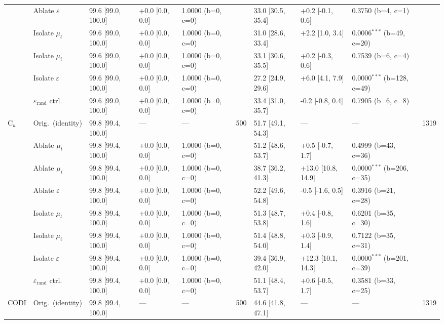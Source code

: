 \begin{table}[h!]
\begin{tabular}{ll lllc lllc}
 & Ablate $\varepsilon$ & 99.6 [99.0, 100.0] & +0.0 [0.0, 0.0] & 1.0000 (b=0, c=0) &  & 33.0 [30.5, 35.4] & +0.2 [-0.1, 0.6] & 0.3750 (b=4, c=1) &  \\
 & Isolate $\mu_t$ & 99.6 [99.0, 100.0] & +0.0 [0.0, 0.0] & 1.0000 (b=0, c=0) &  & 31.0 [28.6, 33.4] & +2.2 [1.0, 3.4] & 0.0006$^{***}$ (b=49, c=20) &  \\
 & Isolate $\mu_i$ & 99.6 [99.0, 100.0] & +0.0 [0.0, 0.0] & 1.0000 (b=0, c=0) &  & 33.1 [30.6, 35.5] & +0.2 [-0.3, 0.6] & 0.7539 (b=6, c=4) &  \\
 & Isolate $\varepsilon$ & 99.6 [99.0, 100.0] & +0.0 [0.0, 0.0] & 1.0000 (b=0, c=0) &  & 27.2 [24.9, 29.6] & +6.0 [4.1, 7.9] & 0.0000$^{***}$ (b=128, c=49) &  \\
 & $\varepsilon_\mathrm{rand}$ ctrl. & 99.6 [99.0, 100.0] & +0.0 [0.0, 0.0] & 1.0000 (b=0, c=0) &  & 33.4 [31.0, 35.7] & -0.2 [-0.8, 0.4] & 0.7905 (b=6, c=8) &  \\
\cmidrule(lr){2-10}
\multirow{8}{*}{C$_u$} & Orig.\ (identity) & 99.8 [99.4, 100.0] & --- & --- & 500 & 51.7 [49.1, 54.3] & --- & --- & 1319 \\
 & Ablate $\mu_t$ & 99.8 [99.4, 100.0] & +0.0 [0.0, 0.0] & 1.0000 (b=0, c=0) &  & 51.2 [48.6, 53.7] & +0.5 [-0.7, 1.7] & 0.4999 (b=43, c=36) &  \\
 & Ablate $\mu_i$ & 99.8 [99.4, 100.0] & +0.0 [0.0, 0.0] & 1.0000 (b=0, c=0) &  & 38.7 [36.2, 41.3] & +13.0 [10.8, 14.9] & 0.0000$^{***}$ (b=206, c=35) &  \\
 & Ablate $\varepsilon$ & 99.8 [99.4, 100.0] & +0.0 [0.0, 0.0] & 1.0000 (b=0, c=0) &  & 52.2 [49.6, 54.8] & -0.5 [-1.6, 0.5] & 0.3916 (b=21, c=28) &  \\
 & Isolate $\mu_t$ & 99.8 [99.4, 100.0] & +0.0 [0.0, 0.0] & 1.0000 (b=0, c=0) &  & 51.3 [48.7, 53.8] & +0.4 [-0.8, 1.6] & 0.6201 (b=35, c=30) &  \\
 & Isolate $\mu_i$ & 99.8 [99.4, 100.0] & +0.0 [0.0, 0.0] & 1.0000 (b=0, c=0) &  & 51.4 [48.8, 54.0] & +0.3 [-0.9, 1.4] & 0.7122 (b=35, c=31) &  \\
 & Isolate $\varepsilon$ & 99.8 [99.4, 100.0] & +0.0 [0.0, 0.0] & 1.0000 (b=0, c=0) &  & 39.4 [36.9, 42.0] & +12.3 [10.1, 14.3] & 0.0000$^{***}$ (b=201, c=39) &  \\
 & $\varepsilon_\mathrm{rand}$ ctrl. & 99.8 [99.4, 100.0] & +0.0 [0.0, 0.0] & 1.0000 (b=0, c=0) &  & 51.1 [48.4, 53.7] & +0.6 [-0.5, 1.7] & 0.3581 (b=33, c=25) &  \\
\cmidrule(lr){2-10}
\multirow{8}{*}{CODI} & Orig.\ (identity) & 99.8 [99.4, 100.0] & --- & --- & 500 & 44.6 [41.8, 47.1] & --- & --- & 1319 \\

\end{tabular}
\end{table}
